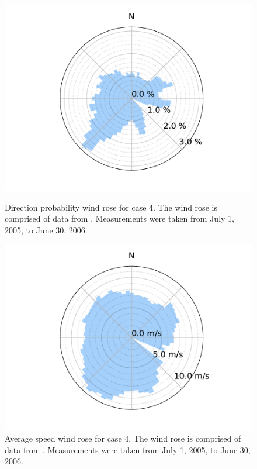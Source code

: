 \documentclass{jpconf}
\begin{document}
\begin{figure}[h!]
	\centering
	\begin{minipage}[t]{18pc}
		\centering
		\includegraphics[width=\textwidth, trim={1.5cm 0cm 1.5cm 0cm}, clip]{final_images/windroses/freqwindrose_72_dir.pdf}
		\caption{Direction probability wind rose for case 4. The wind rose is comprised of data from \cite{noordzeewind2006}. Measurements were taken from July 1, 2005, to June 30, 2006.}
		\label{fig:freqwindrose_72dir}
	\end{minipage} \hspace{1pc}%
	\begin{minipage}[t]{18pc}
		\centering
		\includegraphics[width=1.\textwidth, trim={1.5cm, 0cm, 1.5cm, 0cm}, clip]{final_images/windroses/speedwindrose_72_dir.pdf}
		\caption{Average speed wind rose for case 4. The wind rose is comprised of data from \cite{noordzeewind2006}. Measurements were taken from July 1, 2005, to June 30, 2006.}
		\label{fig:speedwindrose_72dir}
	\end{minipage}
\end{figure}
\end{document}
